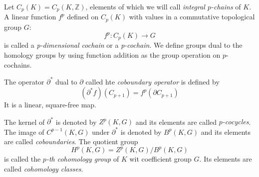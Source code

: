 \begin{defn}

	Let $C_p(K) = C_p(K, \mathbb{Z})$, elements of which we will call \textit{integral $p$-chains} of $K$. A linear function $f^p$ defined on $C_p(K)$ with values in a commutative topological group $G$:
	\[
		f^p: C_p(K) \to G
	\]
	is called a \textit{p-dimensional cochain} or a \textit{p-cochain}. We define groups dual to the homology groups by using function addition as the group operation on $p$-cochains.

\end{defn}


\begin{defn}

The operator $\partial^*$ dual to $ \partial$ called hte \textit{coboundary operator} is defined by 
\[
	\left( \partial^* f \right)(C_{ p+1 }) = f^p \left( \partial C_{ p+1 } \right)
\]
It is a linear, square-free map.
\end{defn}

\begin{defn}

	The kernel of $\partial^*$ is denoted by $Z^p(K,G)$ and its elements are called \textit{$p$-cocycles}. The image of $C^{ p-1 }(K,G)$ under $ \partial^*$ is denoted by $B^p(K,G)$ and its elements are called \textit{coboundaries}. The quotient group 
	\[
		H^p(K,G) = Z^p(K,G) / B^p(K,G)
	\]
	is called the \textit{$p$-th cohomology group} of $K$ wit coefficient group $G$. Its elements are called \textit{cohomology classes}.

\end{defn}

































